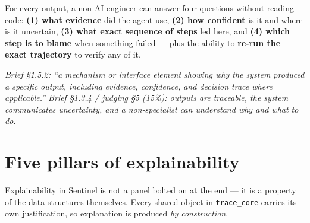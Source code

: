 \documentclass[11pt]{article}
\begin{document}
\thispagestyle{empty}


\vspace{6pt}
\begin{keybox}
For every output, a non-AI engineer can answer four questions without reading code:
\textbf{(1) what evidence} did the agent use, \textbf{(2) how confident} is it and where is it
uncertain, \textbf{(3) what exact sequence of steps} led here, and \textbf{(4) which step is to
blame} when something failed --- plus the ability to \textbf{re-run the exact trajectory} to
verify any of it.
\end{keybox}

\textit{\small Brief \S1.5.2: ``a mechanism or interface element showing why the system produced
a specific output, including evidence, confidence, and decision trace where applicable.'' Brief
\S1.3.4 / judging \S5 (15\%): outputs are traceable, the system communicates uncertainty, and a
non-specialist can understand why and what to do.}

\section{Five pillars of explainability}
Explainability in Sentinel is not a panel bolted on at the end --- it is a property of the
data structures themselves. Every shared object in \texttt{trace\_core} carries its own
justification, so explanation is produced \emph{by construction}.
\end{document}
